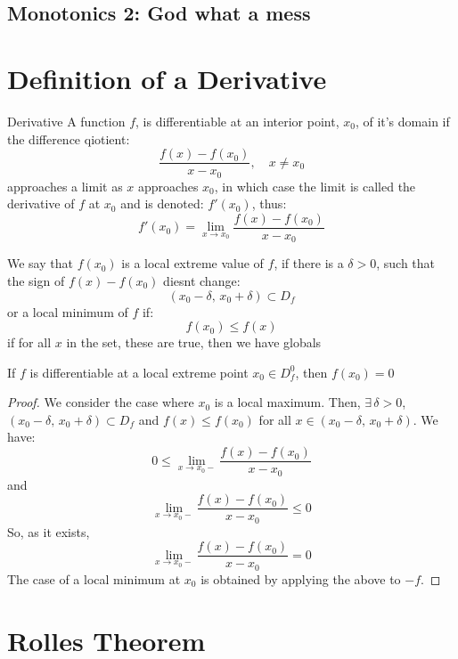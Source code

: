 \documentclass{article}
\newcommand{\sub}{\subset}
\renewcommand{\d}{\delta}
\newcommand{\ex}{\exists\,}
\begin{document}
{{{{\subsection{Monotonics 2: God what a mess}

\section{Definition of a Derivative}
\noindent\begin{definition}{Derivative}{}
   A function $f$, is differentiable at an interior point, $x_0$, of it's domain if the difference qiotient:
   $$ \frac{f(x) - f(x_0)}{x -x_0}, \quad x\neq x_0 $$
   approaches a limit as $x$ approaches $x_0$, in which case the limit is called the {\color{blue} derivative }of $f$ at $x_0$ and is denoted: $f'(x_0)$, thus:
   $$ f'(x_0) = \lim_{x\to x_0}\frac{f(x) - f(x_0)}{x -x_0} $$
\end{definition}\vspace{10pt}

\noindent\begin{definition}{}{}
   We say that $f(x_0)$ is a {\color{blue} local extreme }value of $f$, if there is a $\d > 0$, such that the sign of $f(x) - f(x_0)$ diesnt change:
   $$ (x_0 - \d, \, x_0 + \d) \sub D_f $$
   or a {\color{blue} local minimum } of $f$ if:
   $$ f(x_0) \le f(x) $$
   if for all $x$ in the set, these are true, then we have globals
\end{definition}\vspace{10pt}

\noindent\begin{theorem}{}{}
  If $f$ is differentiable at a local extreme point $x_0 \in D_f^0$, then $f(x_0) = 0$
\end{theorem}\vspace{10pt}
\begin{proof}
  We consider the case where $x_0$ is a local maximum. Then, $\ex \d > 0$, $\displaystyle{(x_0 - \d,\, x_0 + \d) \sub D_f}$ and $f(x) \le f(x_0)$ for all $x\in (x_0-\d,\, x_0+\d)$. We have:
  $$ 0 \le \lim_{x\to x_0-} \frac{f(x) - f(x_0)}{x - x_0} $$
  and
  $$ \lim_{x\to x_0-} \frac{f(x) - f(x_0)}{x - x_0} \le 0$$
  So, as it exists,
  $$ \lim_{x\to x_0-} \frac{f(x) - f(x_0)}{x - x_0} = 0 $$
  The case of a local minimum at $x_0$ is obtained by applying the above to $-f$.
\end{proof}

\section{Rolles Theorem}

}}}}
\end{document}
